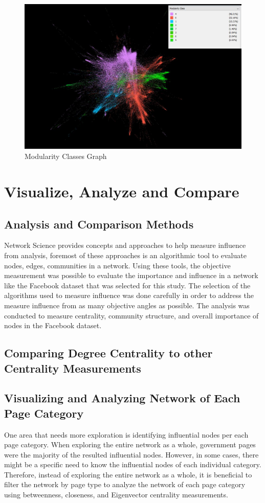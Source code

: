 \documentclass[11pt,twocolumn]{article}
\begin{document}
\begin{figure}[hbt!]
\includegraphics[scale=0.28]{modularity_community.JPG} 
\caption{Modularity Classes Graph}
\end{figure}



\section{Visualize, Analyze and Compare}

\subsection{Analysis and Comparison Methods}
Network Science provides concepts and approaches to help measure influence from analysis, foremost of these approaches is an algorithmic tool to evaluate nodes, edges, communities in a network. Using these tools, the objective measurement was possible to evaluate the importance and influence in a network like the Facebook dataset that was selected for this study. The selection of the algorithms used to measure influence was done carefully in order to address the measure influence from as many objective angles as possible. The analysis was conducted to measure centrality, community structure, and overall importance of nodes in the Facebook dataset.

\subsection{Comparing Degree Centrality to other Centrality Measurements}

\subsection{Visualizing and Analyzing Network of Each Page Category}
One area that needs more exploration is identifying influential nodes per each page category. When exploring the entire network as a whole, government pages were the majority of the resulted influential nodes. However, in some cases, there might be a specific need to know the influential nodes of each individual category. Therefore, instead of exploring the entire network as a whole, it is beneficial to filter the network by page type to analyze the network of each page category using betweenness, closeness, and Eigenvector centrality measurements. 
\end{document}
